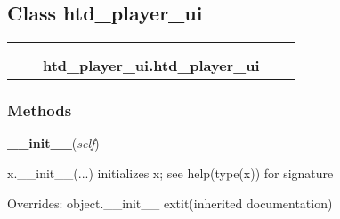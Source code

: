 
\subsection{Class htd\_player\_ui}

    \label{htd_player_ui:htd_player_ui}
\begin{tabular}{cccccc}
\multicolumn{2}{r}{\settowidth{\BCL}{object}\multirow{2}{\BCL}{object}}
&&
  \\\cline{3-3}
  &&\multicolumn{1}{c|}{}
&&
  \\
&&\multicolumn{2}{l}{\textbf{htd\_player\_ui.htd\_player\_ui}}
\end{tabular}



  \subsubsection{Methods}

    \vspace{0.5ex}

\hspace{.8\funcindent}\begin{boxedminipage}{\funcwidth}

    \raggedright \textbf{\_\_init\_\_}(\textit{self})

\setlength{\parskip}{2ex}
    x.\_\_init\_\_(...) initializes x; see help(type(x)) for signature

\setlength{\parskip}{1ex}
      Overrides: object.\_\_init\_\_ 	extit{(inherited documentation)}

    \end{boxedminipage}

    \label{htd_player_ui:htd_player_ui:close}

    \vspace{0.5ex}

